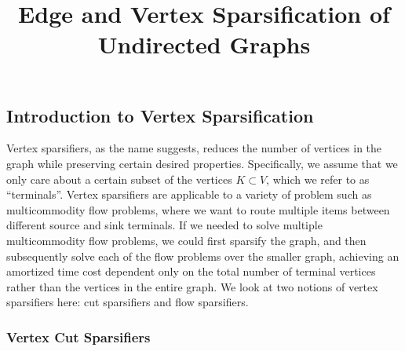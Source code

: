 \documentclass[12pt]{article}
\begin{document}
    \title{Edge and Vertex Sparsification of Undirected Graphs}
    \date{}
    \maketitle

    \subsection{Introduction to Vertex Sparsification}
    
    
    Vertex sparsifiers, as the name suggests, reduces the number of vertices in the graph while preserving certain desired properties. Specifically, we assume that we only care about a certain subset of the vertices $K \subset V$, which we refer to as ``terminals''. Vertex sparsifiers are applicable to a variety of problem such as multicommodity flow problems, where we want to route multiple items between different source and sink terminals. If we needed to solve multiple multicommodity flow problems, we could first sparsify the graph, and then subsequently solve each of the flow problems over the smaller graph, achieving an amortized time cost dependent only on the total number of terminal vertices rather than the vertices in the entire graph. We look at two notions of vertex sparsifiers here: cut sparsifiers and flow sparsifiers.
    
    \subsubsection{Vertex Cut Sparsifiers}
    
    
\end{document}
